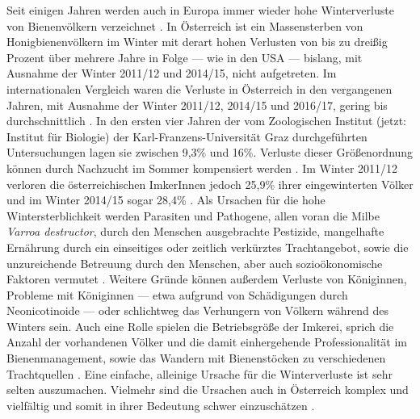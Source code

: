 \newline
Seit einigen Jahren werden auch in Europa immer wieder hohe Winterverluste von Bienenvölkern verzeichnet \citep{chauzat2016}. In Österreich ist ein Massensterben von Honigbienenvölkern im Winter mit derart hohen Verlusten von bis zu dreißig Prozent über mehrere Jahre in Folge --- wie in den USA --- bislang, mit Ausnahme der Winter 2011/12 und 2014/15, nicht aufgetreten. Im internationalen Vergleich waren die Verluste in Österreich in den vergangenen Jahren, mit Ausnahme der Winter 2011/12, 2014/15 und 2016/17, gering bis durchschnittlich \citep{vanderzee2012, vanderzee2014, brodschneider2016, brodschneider2018, brodschneider2019}. In den ersten vier Jahren der vom Zoologischen Institut (jetzt: Institut für Biologie) der Karl-Franzens-Universität Graz durchgeführten Untersuchungen lagen sie zwischen 9,3\% und 16\%. Verluste dieser Größenordnung können durch Nachzucht im Sommer kompensiert werden \citep{brodschneider2019}. Im Winter 2011/12 verloren die österreichischen ImkerInnen jedoch 25,9\% ihrer eingewinterten Völker \citep{brodschneider2013} und im Winter 2014/15 sogar 28,4\% \citep{crailsheim2018}. Als Ursachen für die hohe Wintersterblichkeit werden Parasiten und Pathogene, allen voran die Milbe \textit{Varroa destructor}, durch den Menschen ausgebrachte Pestizide, mangelhafte Ernährung durch ein einseitiges oder zeitlich verkürztes Trachtangebot, sowie die unzureichende Betreuung durch den Menschen, aber auch sozioökonomische Faktoren vermutet \citep{genersch2010, budge2015, budge2015a, goulson2015, lee2015, moritz2016, tsvetkov2017, woodcock2017, jacques2017}. Weitere Gründe können außerdem Verluste von Königinnen, Probleme mit Königinnen --- etwa aufgrund von Schädigungen durch Neonicotinoide \citep{williams2015, dussaubat2016, wu-smart2016,  siefert2020} --- oder schlichtweg das Verhungern von Völkern während des Winters sein. Auch eine Rolle spielen die Betriebsgröße der Imkerei, sprich die Anzahl der vorhandenen Völker und die damit einhergehende Professionalität im Bienenmanagement, sowie das Wandern mit Bienenstöcken zu verschiedenen Trachtquellen \citep{vanderzee2012,vanderzee2014,steinhauer2014,lee2015,gray2019,oberreiter2020}. Eine einfache, alleinige Ursache für die Winterverluste ist sehr selten auszumachen. Vielmehr sind die Ursachen auch in Österreich komplex und vielfältig und somit in ihrer Bedeutung schwer einzuschätzen \citep{brodschneider2010, moritz2010, potts2010, brodschneider2013, staveley2014, doke2015, goulson2015, oberreiter2020}.
\newline
